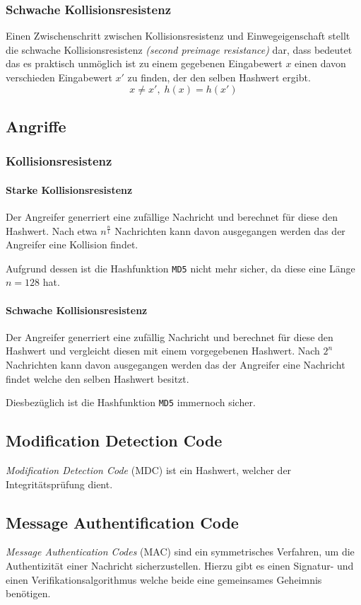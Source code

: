 \documentclass[a4paper,landscape]{article}
\begin{document}
\begin{multicols*}{4}
	\subsubsection{Schwache Kollisionsresistenz}
	Einen Zwischenschritt zwischen Kollisionsresistenz und Einwegeigenschaft
	stellt die schwache Kollisionsresistenz \emph{(second preimage resistance)}
	dar, dass bedeutet das es praktisch unmöglich ist zu einem gegebenen
	Eingabewert \(x\) einen davon verschieden Eingabewert \(x'\) zu finden, der
	den selben Hashwert ergibt. \[x \neq x',\; h(x) = h(x')\]

	\subsection{Angriffe}
	\subsubsection*{Kollisionsresistenz}
	\paragraph{Starke Kollisionsresistenz}
	Der Angreifer generriert eine zufällige Nachricht und berechnet für diese
	den Hashwert. Nach etwa \(n^{\frac{n}{1}}\) Nachrichten kann davon
	ausgegangen werden das der Angreifer eine Kollision findet. \par
	Aufgrund dessen ist die Hashfunktion \texttt{MD5} nicht mehr sicher, da
	diese eine Länge \(n = 128\) hat.
	\paragraph{Schwache Kollisionsresistenz}
	Der Angreifer generriert eine zufällig Nachricht und berechnet für diese
	den Hashwert und vergleicht diesen mit einem vorgegebenen Hashwert. Nach
	\(2^{n}\) Nachrichten kann davon ausgegangen werden das der Angreifer eine
	Nachricht findet welche den selben Hashwert besitzt. \par
	Diesbezüglich ist die Hashfunktion \texttt{MD5} immernoch sicher.

	\subsection{Modification Detection Code}
	\emph{Modification Detection Code} (MDC) ist ein Hashwert, welcher der
	Integritätsprüfung dient.

	\subsection{Message Authentification Code}
	\emph{Message Authentication Codes} (MAC) sind ein symmetrisches Verfahren,
	um die Authentizität einer Nachricht sicherzustellen. Hierzu gibt es einen
	Signatur- und einen Verifikationsalgorithmus welche beide eine gemeinsames
	Geheimnis benötigen.

\end{multicols*}
\end{document}
